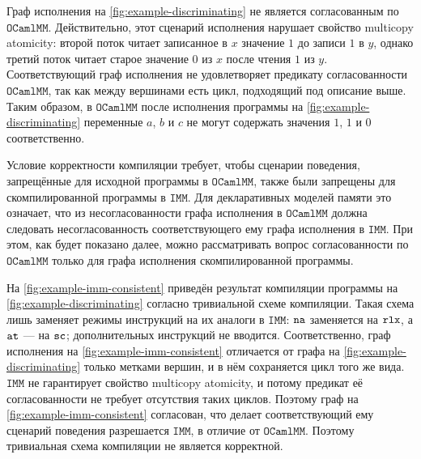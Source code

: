 \documentclass[14pt]{matmex-diploma-custom}
\newcommand{\IMM}{\mathtt{IMM}}
\newcommand{\OMM}{\mathtt{OCaml}\allowbreak \mathtt{MM}}
\begin{document}
Граф исполнения на \cref{fig:example-discriminating} не является согласованным по $\OMM$. Действительно, этот сценарий исполнения нарушает свойство multicopy atomicity: второй поток читает записанное в $x$ значение $1$ до записи $1$ в $y$, однако третий поток читает старое значение $0$ из $x$ после чтения $1$ из $y$. Соответствующий граф исполнения не удовлетворяет предикату согласованности $\OMM$, так как между вершинами есть цикл, подходящий под описание выше. Таким образом, в $\OMM$ после исполнения программы на \cref{fig:example-discriminating} переменные $a$, $b$ и $c$ не могут содержать значения $1$, $1$ и $0$ соответственно.

Условие корректности компиляции требует, чтобы сценарии поведения, запрещённые для исходной программы в $\OMM$, также были запрещены для скомпилированной программы в $\IMM$. Для декларативных моделей памяти это означает, что из несогласованности графа исполнения в $\OMM$ должна следовать несогласованность соответствующего ему графа исполнения  в $\IMM$. При этом, как будет показано далее, можно рассматривать вопрос согласованности по $\OMM$ только для графа исполнения скомпилированной программы.

На \cref{fig:example-imm-consistent} приведён результат компиляции программы на \cref{fig:example-discriminating} согласно тривиальной схеме компиляции. 
Такая схема лишь заменяет режимы инструкций на их аналоги в $\IMM$: ${\mathtt{na}}$ заменяется на $\mathtt{rlx}$, а ${\mathtt{at}}$ — на ${\mathtt{sc}}$; дополнительных инструкций не вводится. Соответственно, граф исполнения на \cref{fig:example-imm-consistent} отличается от графа на \cref{fig:example-discriminating} только метками вершин, и в нём сохраняется цикл того же вида. $\IMM$ не гарантирует свойство multicopy atomicity, и потому предикат её согласованности не требует отсутствия таких циклов. Поэтому граф на \cref{fig:example-imm-consistent} согласован, что делает соответствующий ему сценарий поведения разрешается $\IMM$, в отличие от $\OMM$. Поэтому тривиальная схема компиляции не является корректной.
\end{document}
